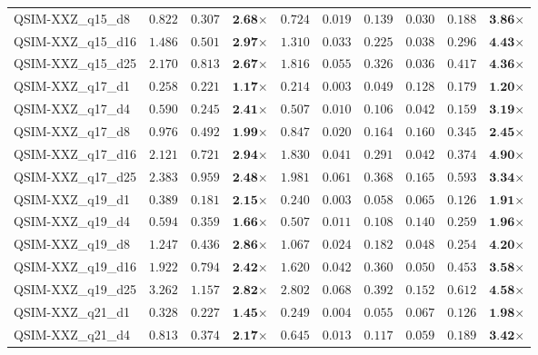 \begin{table*}[t]
{\begin{tabular}{| l || r r c || r r r r r c |}
QSIM-XXZ\_q15\_d8 & $0.822$ & $0.307$ & $\textbf{2.68}$$\times$ & $0.724$ & $0.019$ & $0.139$ & $0.030$ & $0.188$ & $\textbf{3.86}$$\times$ \\
QSIM-XXZ\_q15\_d16 & $1.486$ & $0.501$ & $\textbf{2.97}$$\times$ & $1.310$ & $0.033$ & $0.225$ & $0.038$ & $0.296$ & $\textbf{4.43}$$\times$ \\
QSIM-XXZ\_q15\_d25 & $2.170$ & $0.813$ & $\textbf{2.67}$$\times$ & $1.816$ & $0.055$ & $0.326$ & $0.036$ & $0.417$ & $\textbf{4.36}$$\times$ \\
QSIM-XXZ\_q17\_d1 & $0.258$ & $0.221$ & $\textbf{1.17}$$\times$ & $0.214$ & $0.003$ & $0.049$ & $0.128$ & $0.179$ & $\textbf{1.20}$$\times$ \\
QSIM-XXZ\_q17\_d4 & $0.590$ & $0.245$ & $\textbf{2.41}$$\times$ & $0.507$ & $0.010$ & $0.106$ & $0.042$ & $0.159$ & $\textbf{3.19}$$\times$ \\
QSIM-XXZ\_q17\_d8 & $0.976$ & $0.492$ & $\textbf{1.99}$$\times$ & $0.847$ & $0.020$ & $0.164$ & $0.160$ & $0.345$ & $\textbf{2.45}$$\times$ \\
QSIM-XXZ\_q17\_d16 & $2.121$ & $0.721$ & $\textbf{2.94}$$\times$ & $1.830$ & $0.041$ & $0.291$ & $0.042$ & $0.374$ & $\textbf{4.90}$$\times$ \\
QSIM-XXZ\_q17\_d25 & $2.383$ & $0.959$ & $\textbf{2.48}$$\times$ & $1.981$ & $0.061$ & $0.368$ & $0.165$ & $0.593$ & $\textbf{3.34}$$\times$ \\
QSIM-XXZ\_q19\_d1 & $0.389$ & $0.181$ & $\textbf{2.15}$$\times$ & $0.240$ & $0.003$ & $0.058$ & $0.065$ & $0.126$ & $\textbf{1.91}$$\times$ \\
QSIM-XXZ\_q19\_d4 & $0.594$ & $0.359$ & $\textbf{1.66}$$\times$ & $0.507$ & $0.011$ & $0.108$ & $0.140$ & $0.259$ & $\textbf{1.96}$$\times$ \\
QSIM-XXZ\_q19\_d8 & $1.247$ & $0.436$ & $\textbf{2.86}$$\times$ & $1.067$ & $0.024$ & $0.182$ & $0.048$ & $0.254$ & $\textbf{4.20}$$\times$ \\
QSIM-XXZ\_q19\_d16 & $1.922$ & $0.794$ & $\textbf{2.42}$$\times$ & $1.620$ & $0.042$ & $0.360$ & $0.050$ & $0.453$ & $\textbf{3.58}$$\times$ \\
QSIM-XXZ\_q19\_d25 & $3.262$ & $1.157$ & $\textbf{2.82}$$\times$ & $2.802$ & $0.068$ & $0.392$ & $0.152$ & $0.612$ & $\textbf{4.58}$$\times$ \\
QSIM-XXZ\_q21\_d1 & $0.328$ & $0.227$ & $\textbf{1.45}$$\times$ & $0.249$ & $0.004$ & $0.055$ & $0.067$ & $0.126$ & $\textbf{1.98}$$\times$ \\
QSIM-XXZ\_q21\_d4 & $0.813$ & $0.374$ & $\textbf{2.17}$$\times$ & $0.645$ & $0.013$ & $0.117$ & $0.059$ & $0.189$ & $\textbf{3.42}$$\times$ \\

\end{tabular}}
\end{table*}
